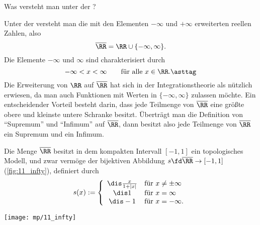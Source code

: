 \begin{frage}
  Was versteht man unter der 
  ?
\end{frage}

\begin{antwort}
  Unter der  versteht man 
  die mit den Elementen $-\infty$ und $+\infty$ erweiterten reellen Zahlen, 
  also 
  \[
  \overline{\RR} = \RR \cup \{ -\infty, \infty \}.
  \]
  Die Elemente $-\infty$ und $\infty$ sind charakterisiert durch
  \[
  -\infty < x <  \infty \qquad\text{f\"ur alle $x\in \RR$}. 
  \asttag
  \]
  Die Erweiterung von $\RR$ auf $\overline{\RR}$ 
  hat sich in der Integrationstheorie als n\"utzlich erwiesen, 
  da man auch Funktionen mit Werten in $\{ -\infty, \infty\}$ 
  zulassen m\"ochte. Ein entscheidender Vorteil besteht darin, dass 
  jede Teilmenge von $\overline{\RR}$ eine größte obere und kleinste 
  untere Schranke besitzt. Überträgt man die Definition von "`Supremum"' und 
  "`Infimum"' auf $\overline{\RR}$, dann besitzt also jede Teilmenge von 
  $\overline{\RR}$ ein Supremum und ein Infimum.  


  Die Menge $\overline{\RR}$ besitzt in dem kompakten Intervall 
  $[-1,1]$ ein topologisches Modell, und zwar {\zB} 
  verm\"oge der bijektiven Abbildung $s\fd \overline{\RR}\to[-1,1]$ 
  (\sieheAbbildung\ref{fig:11_infty}), 
  definiert durch
  \[
  s(x) := \left\{ \begin{array}{cl} 
      \dis \frac{x}{1+|x|} & \text{f\"ur $x\not=\pm\infty$} \\
      \dis 1 & \text{f\"ur $x=\infty$} \\
      \dis -1 & \text{f\"ur $x=-\infty$}. 
    \end{array}\right.
  \]

  \begin{center}
    \texttt{[image: mp/11\_infty]}
    \label{fig:11_infty}
  \end{center}


\end{antwort}
